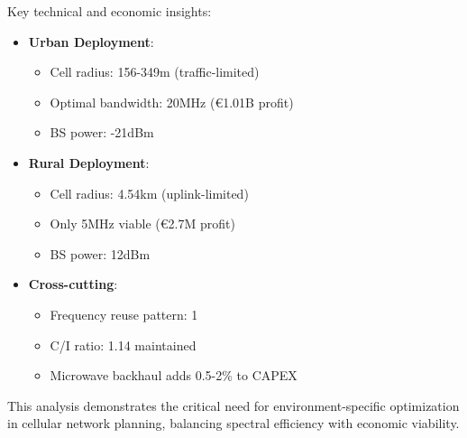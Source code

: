 \documentclass[a4paper,12pt]{article}
\begin{document}
Key technical and economic insights:

\begin{itemize}
    \item \textbf{Urban Deployment}:
    \begin{itemize}
        \item Cell radius: 156-349m (traffic-limited)
        \item Optimal bandwidth: 20MHz (€1.01B profit)
        \item BS power: -21dBm
    \end{itemize}
    
    \item \textbf{Rural Deployment}:
    \begin{itemize}
        \item Cell radius: 4.54km (uplink-limited)
        \item Only 5MHz viable (€2.7M profit)
        \item BS power: 12dBm
    \end{itemize}
    
    \item \textbf{Cross-cutting}:
    \begin{itemize}
        \item Frequency reuse pattern: 1
        \item C/I ratio: 1.14 maintained
        \item Microwave backhaul adds 0.5-2\% to CAPEX
    \end{itemize}
\end{itemize}

This analysis demonstrates the critical need for environment-specific optimization in cellular network planning, balancing spectral efficiency with economic viability.
\end{document}
